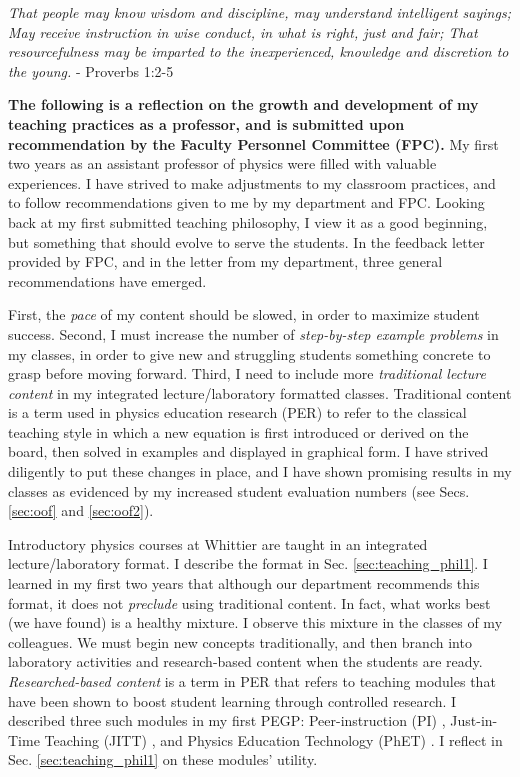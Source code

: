 \documentclass[../../main.tex]{subfiles}
\begin{document}
\epigraph{\textit{That people may know wisdom and discipline, may understand intelligent sayings; May receive instruction in wise conduct, in what is right, just and fair; That resourcefulness may be imparted to the inexperienced, knowledge and discretion to the young.} - Proverbs 1:2-5}{}

\textbf{The following is a reflection on the growth and development of my teaching practices as a professor, and is submitted upon recommendation by the Faculty Personnel Committee (FPC).}  My first two years as an assistant professor of physics were filled with valuable experiences.  I have strived to make adjustments to my classroom practices, and to follow recommendations given to me by my department and FPC.  Looking back at my first submitted teaching philosophy, I view it as a good beginning, but something that should evolve to serve the students.  In the feedback letter provided by FPC, and in the letter from my department, three general recommendations have emerged. \\ \hspace{0.1cm}

First, the \textit{pace} of my content should be slowed, in order to maximize student success.  Second, I must increase the number of \textit{step-by-step example problems} in my classes, in order to give new and struggling students something concrete to grasp before moving forward.  Third, I need to include more \textit{traditional lecture content} in my integrated lecture/laboratory formatted classes.  Traditional content is a term used in physics education research (PER) to refer to the classical teaching style in which a new equation is first introduced or derived on the board, then solved in examples and displayed in graphical form.  I have strived diligently to put these changes in place, and I have shown promising results in my classes as evidenced by my increased student evaluation numbers (see Secs. \ref{sec:oof} and \ref{sec:oof2}). \\ \hspace{0.1cm}

Introductory physics courses at Whittier are taught in an integrated lecture/laboratory format.  I describe the format in Sec. \ref{sec:teaching_phil1}.  I learned in my first two years that although our department recommends this format, it does not \textit{preclude} using traditional content.  In fact, what works best (we have found) is a healthy mixture.  I observe this mixture in the classes of my colleagues.  We must begin new concepts traditionally, and then branch into laboratory activities and research-based content when the students are ready.  \textit{Researched-based content} is a term in PER that refers to teaching modules that have been shown to boost student learning through controlled research.  I described three such modules in my first PEGP: Peer-instruction (PI) \cite{mazur2013peer}, Just-in-Time Teaching (JITT) \cite{jitt}, and Physics Education Technology (PhET) \cite{phet}.  I reflect in Sec. \ref{sec:teaching_phil1} on these modules' utility. \\ \hspace{0.1cm}
\end{document}
